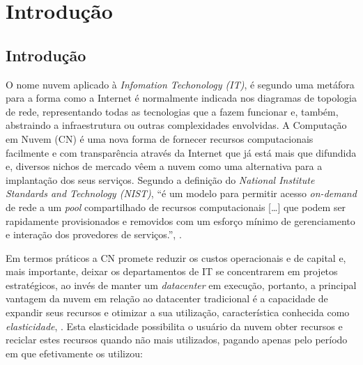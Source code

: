 
\part{Introdução}

\chapter*[Introdução]{Introdução}

O nome \textsf{nuvem} aplicado à \textit{Infomation Techonology (IT)}, é segundo
 uma metáfora para a forma como a Internet é normalmente
indicada nos diagramas de topologia de rede, representando todas as tecnologias
que a fazem funcionar e, também, abstraindo a infraestrutura ou outras
complexidades envolvidas. A \textsf{Computação em Nuvem (CN)} é uma nova forma
de fornecer recursos computacionais facilmente e com transparência através da
Internet que já está mais que difundida e, diversos nichos de mercado vêem a
nuvem como uma alternativa para a implantação dos seus serviços. Segundo a
definição do \textit{National Institute Standards and Technology (NIST)}, ``é um
modelo para permitir acesso \textit{on-demand} de rede a um \textit{pool}
compartilhado de recursos computacionais [\ldots] que podem ser rapidamente
provisionados e removidos com um esforço mínimo de gerenciamento e interação dos
provedores de serviços.'', .

Em termos práticos a CN promete reduzir os custos operacionais e de capital e,
mais importante, deixar os departamentos de IT se concentrarem em projetos
estratégicos, ao invés de manter um \textit{datacenter} em execução, portanto, a
principal vantagem da nuvem em relação ao datacenter tradicional é a capacidade
de expandir seus recursos e otimizar a sua utilização, característica conhecida
como \emph{elasticidade}, . Esta
elasticidade possibilita o usuário da nuvem obter recursos e reciclar estes
recursos quando não mais utilizados, pagando apenas pelo período em que
efetivamente os utilizou:

